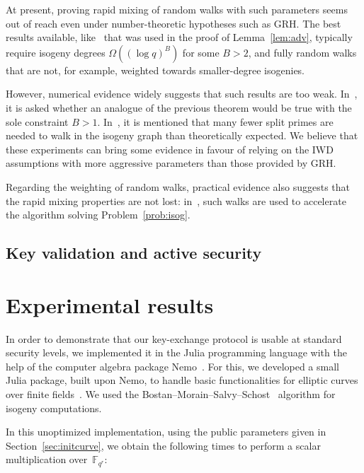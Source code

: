 \documentclass{article}
\newcommand{\F}{\mathbb{F}}
\theoremstyle{definition}
\begin{document}
At present, proving rapid mixing of random walks with such
parameters seems out of reach even under number-theoretic
hypotheses such as GRH. The best results available,
like~\cite[Theorem~1.5]{jao+miller+venkatesan09}
that was used in the proof of Lemma~\ref{lem:adv},
typically require isogeny degrees $\Omega((\log q)^B)$
for some $B>2$, and fully random walks that are not,
for example, weighted towards smaller-degree isogenies.

However, numerical evidence widely suggests that
such results are too weak. In~\cite[7.2]{jao+miller+venkatesan09},
it is asked whether an analogue of the previous theorem would
be true with the sole constraint $B>1$. In~\cite[Section~3]{GHS},
it is mentioned that many fewer split primes are needed to walk
in the isogeny graph than theoretically expected.
We believe that these experiments can bring some evidence
in favour of relying on the IWD assumptions with more aggressive
parameters than those provided by GRH.

Regarding the weighting of random walks,
practical evidence also suggests that the rapid mixing
properties are not lost: in~\cite{galbraith+stolbunov11},
such walks are used to accelerate the algorithm
solving Problem~\ref{prob:isog}.

\subsection{Key validation and active security}



\section{Experimental results}
\label{sec:exp}

In order to demonstrate that our key-exchange protocol is usable
at standard security levels, we implemented it in the Julia
programming language with the help of the computer algebra package
Nemo~\cite{todo:Nemo}. For this, we developed a small
Julia package, built upon Nemo, to handle basic functionalities
for elliptic curves over finite fields~\cite{todo:package}.
We used the Bostan--Morain--Salvy--Schost~\cite{todo:BMSS} algorithm for
isogeny computations.

In this unoptimized implementation, 
using the public parameters given in
Section~\ref{sec:initcurve},
we obtain
the following times to perform a scalar multiplication over~$\F_{q^r}$:
\end{document}
